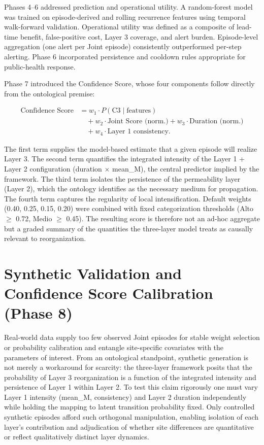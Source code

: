\documentclass[11pt,a4paper]{article}
\begin{document}
Phases 4--6 addressed prediction and operational utility. A random-forest model was trained on episode-derived and rolling recurrence features using temporal walk-forward validation. Operational utility was defined as a composite of lead-time benefit, false-positive cost, Layer 3 coverage, and alert burden. Episode-level aggregation (one alert per Joint episode) consistently outperformed per-step alerting. Phase 6 incorporated persistence and cooldown rules appropriate for public-health response.

Phase 7 introduced the Confidence Score, whose four components follow directly from the ontological premise:
\begin{sloppypar}
\[
\begin{aligned}
\text{Confidence Score} &= w_1 \cdot P(\text{C3} \mid \text{features}) \\
&\quad + w_2 \cdot \text{Joint Score (norm.)} + w_3 \cdot \text{Duration (norm.)} \\
&\quad + w_4 \cdot \text{Layer 1 consistency}.
\end{aligned}
\]
\end{sloppypar}
The first term supplies the model-based estimate that a given episode will realize Layer 3. The second term quantifies the integrated intensity of the Layer 1 + Layer 2 configuration (duration \(\times\) mean\_M), the central predictor implied by the framework. The third term isolates the persistence of the permeability layer (Layer 2), which the ontology identifies as the necessary medium for propagation. The fourth term captures the regularity of local intensification. Default weights (0.40, 0.25, 0.15, 0.20) were combined with fixed categorization thresholds (Alto $\geq$ 0.72, Medio $\geq$ 0.45). The resulting score is therefore not an ad-hoc aggregate but a graded summary of the quantities the three-layer model treats as causally relevant to reorganization.

\section{Synthetic Validation and Confidence Score Calibration (Phase 8)}

Real-world data supply too few observed Joint episodes for stable weight selection or probability calibration and entangle site-specific covariates with the parameters of interest. From an ontological standpoint, synthetic generation is not merely a workaround for scarcity: the three-layer framework posits that the probability of Layer 3 reorganization is a function of the integrated intensity and persistence of Layer 1 within Layer 2. To test this claim rigorously one must vary Layer 1 intensity (mean\_M, consistency) and Layer 2 duration independently while holding the mapping to latent transition probability fixed. Only controlled synthetic episodes afford such orthogonal manipulation, enabling isolation of each layer's contribution and adjudication of whether site differences are quantitative or reflect qualitatively distinct layer dynamics.
\end{document}
